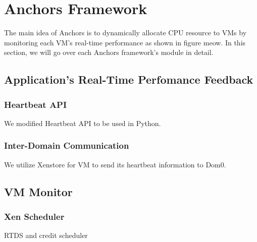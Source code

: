 \section{Anchors Framework}


The main idea of Anchors is to dynamically allocate CPU resource to VMs by monitoring each VM’s real-time performance as shown in figure {meow}. In this section, we will go over each Anchors framework’s module in detail.


\subsection{Application's Real-Time Perfomance Feedback}

\subsubsection{Heartbeat API} 
We modified Heartbeat API to be used in Python. 
\subsubsection{Inter-Domain Communication}
We utilize Xenstore for VM to send its heartbeat information to Dom0.

\subsection{VM Monitor}

\subsubsection{Xen Scheduler}
RTDS and credit scheduler








